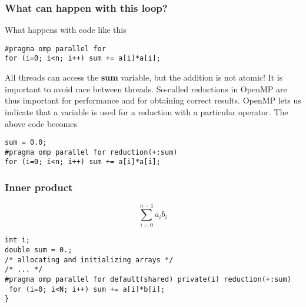 \documentclass{beamer}
\begin{document}
\begin{frame}
\frametitle{What can happen with this loop?}

\begin{block}{}
What happens with code like this 



\begin{verbatim}
#pragma omp parallel for
for (i=0; i<n; i++) sum += a[i]*a[i];

\end{verbatim}

All threads can access the \textbf{sum} variable, but the addition is not atomic! It is important to avoid race between threads. So-called reductions in OpenMP are thus important for performance and for obtaining correct results.  OpenMP lets us indicate that a variable is used for a reduction with a particular operator. The above code becomes




\begin{verbatim}
sum = 0.0;
#pragma omp parallel for reduction(+:sum)
for (i=0; i<n; i++) sum += a[i]*a[i];

\end{verbatim}


\end{block}
\end{frame}

\begin{frame}
\frametitle{Inner product}

\begin{block}{}
\[
\sum_{i=0}^{n-1} a_ib_i
\]








\begin{verbatim}
int i;
double sum = 0.;
/* allocating and initializing arrays */
/* ... */
#pragma omp parallel for default(shared) private(i) reduction(+:sum)
 for (i=0; i<N; i++) sum += a[i]*b[i];
}

\end{verbatim}


\end{block}
\end{frame}
\end{document}
